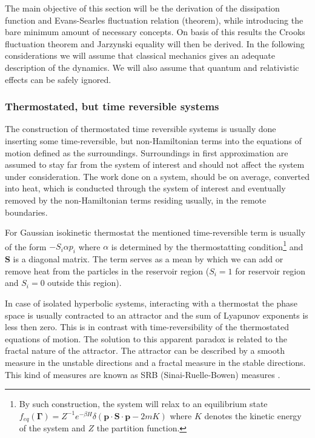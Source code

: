 \documentclass[a4paper,12pt]{article}
\begin{document}
The main objective of this section will be the derivation of the dissipation function and Evans-Searles fluctuation relation (theorem), while introducing the bare minimum amount of necessary concepts. On basis of this results the Crooks fluctuation theorem and Jarzynski equality will then be derived. In the following considerations we will assume that classical mechanics gives an adequate description of the dynamics. We will also assume that quantum and relativistic effects can be safely ignored.

\subsubsection{Thermostated, but time reversible systems}

The construction of thermostated time reversible systems is usually done inserting some time-reversible, but non-Hamiltonian terms into the equations of motion defined as the surroundings. Surroundings in first approximation are assumed to stay far from the system of interest and should not affect the system under consideration.
The work done on a system, should be on average, converted into heat, which is conducted through the system of interest and eventually removed by the non-Hamiltonian terms residing usually, in the remote boundaries.

For Gaussian isokinetic thermostat the mentioned time-reversible term is usually of the form $- S_i \alpha p_i $ where $\alpha$ is determined by the thermostatting condition\footnote{By such construction, the system will relax to an equilibrium state $f_{eq}(\bm{\Gamma})=Z^{-1} e^{-\beta H}\delta(\bm{p}\cdot \bm{S}\cdot \bm{p}-2m K)$ where $K$ denotes the kinetic energy of the system and $Z$ the partition function.}
 and $\textbf{S}$ is a diagonal matrix. The term serves as a mean by which we can add or remove heat from the particles in the reservoir region ($S_i =1$ for reservoir region and $S_i = 0$ outside this region).

In case of isolated hyperbolic systems, interacting with a thermostat the phase space is usually contracted to an attractor and the sum of Lyapunov exponents is less then zero.
This is in contrast with time-reversibility of the thermostated equations of motion. The solution to this apparent paradox is related to the fractal nature of the attractor.
The attractor can be described by a smooth measure in the unstable directions and a fractal measure in the stable directions.
This kind of measures are known as SRB (Sinai-Ruelle-Bowen) measures \cite{Dorfman:ozm67-zD}.
\end{document}
